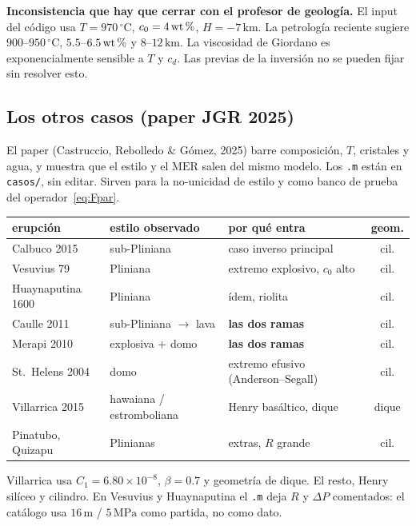 \documentclass[11pt,a4paper]{article}
\theoremstyle{plain}
\theoremstyle{definition}
\theoremstyle{remark}
\newcommand{\pc}{\ifmmode\text{\,\%}\else\,\%\fi}
\newcommand{\MER}{\mathrm{MER}}
\begin{document}
\textbf{Inconsistencia que hay que cerrar con el profesor de
geología.} El input del código usa $T=970\,^{\circ}\mathrm{C}$,
$c_0=4\,\mathrm{wt\pc}$, $H=-7\,\mathrm{km}$. La petrología reciente
sugiere $900$--$950\,^{\circ}\mathrm{C}$, $5.5$--$6.5\,\mathrm{wt\pc}$
y $8$--$12\,\mathrm{km}$. La viscosidad de Giordano es
exponencialmente sensible a $T$ y $c_d$. Las previas de la inversión
no se pueden fijar sin resolver esto.

\subsection{Los otros casos (paper JGR 2025)}

El paper (Castruccio, Rebolledo \& Gómez, 2025) barre composición,
$T$, cristales y agua, y muestra que el estilo y el $\MER$ salen del
mismo modelo. Los \texttt{.m} están en \texttt{casos/}, sin editar.
Sirven para la no-unicidad de estilo y como banco de prueba del
operador~\eqref{eq:Fpar}.

\begin{center}
\footnotesize
\begin{tabular}{@{}p{}p{}p{}c@{}}
\toprule
erupción & estilo observado & por qué entra & geom. \\
\midrule
Calbuco 2015 & sub-Pliniana & caso inverso principal & cil. \\
Vesuvius 79 & Pliniana & extremo explosivo, $c_0$ alto & cil. \\
Huaynaputina 1600 & Pliniana & ídem, riolita & cil. \\
Caulle 2011 & sub-Pliniana $\to$ lava & \textbf{las dos ramas} & cil. \\
Merapi 2010 & explosiva + domo & \textbf{las dos ramas} & cil. \\
St.\ Helens 2004 & domo & extremo efusivo (Anderson--Segall) & cil. \\
Villarrica 2015 & hawaiana / estromboliana & Henry basáltico, dique & dique \\
Pinatubo, Quizapu & Plinianas & extras, $R$ grande & cil. \\
\bottomrule
\end{tabular}
\end{center}

Villarrica usa $C_1=6.80\times10^{-8}$, $\beta=0.7$ y geometría de
dique. El resto, Henry silíceo y cilindro. En Vesuvius y
Huaynaputina el \texttt{.m} deja $R$ y $\Delta P$ comentados: el
catálogo usa $16\,\mathrm{m}$ / $5\,\mathrm{MPa}$ como partida, no
como dato.
\end{document}
